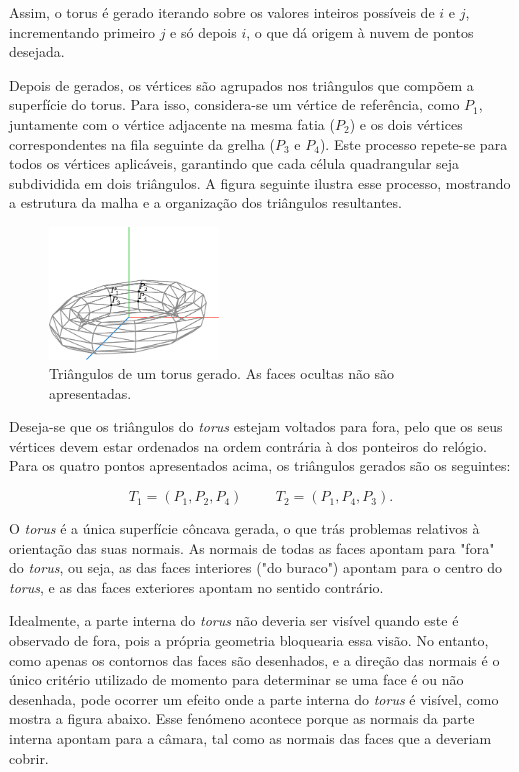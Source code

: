 \documentclass[12pt, a4paper]{article}
\begin{document}
Assim, o torus é gerado iterando sobre os valores inteiros possíveis de $i$ e $j$, incrementando
primeiro $j$ e só depois $i$, o que dá origem à nuvem de pontos desejada.

Depois de gerados, os vértices são agrupados nos triângulos que compõem a superfície do torus. Para
isso, considera-se um vértice de referência, como $P_1$, juntamente com o vértice adjacente na
mesma fatia ($P_2$) e os dois vértices correspondentes na fila seguinte da grelha ($P_3$ e $P_4$).
Este processo repete-se para todos os vértices aplicáveis, garantindo que cada célula quadrangular
seja subdividida em dois triângulos. A figura seguinte ilustra esse processo, mostrando a estrutura
da malha e a organização dos triângulos resultantes.

\begin{figure}[H]
    \centering
    \includegraphics[width=0.4\textwidth]{res/figures/TorusTriangle.pdf}
    \caption{Triângulos de um torus gerado. As faces ocultas não são apresentadas.}
\end{figure}

Deseja-se que os triângulos do \emph{torus} estejam voltados para fora, pelo que os seus vértices
devem estar ordenados na ordem contrária à dos ponteiros do relógio. Para os quatro pontos
apresentados acima, os triângulos gerados são os seguintes:

$$
T_1 = (P_1, P_2, P_4)
\hspace{1cm}
T_2 = (P_1, P_4, P_3).
$$

O \emph{torus} é a única superfície côncava gerada, o que trás problemas relativos à orientação das
suas normais. As normais de todas as faces apontam para "fora"{} do \emph{torus}, ou seja, as das
faces interiores ("do buraco"{}) apontam para o centro do \emph{torus}, e as das faces exteriores
apontam no sentido contrário.

Idealmente, a parte interna do \emph{torus} não deveria ser visível quando este é observado de fora,
pois a própria geometria bloquearia essa visão. No entanto, como apenas os contornos das faces são
desenhados, e a direção das normais é o único critério utilizado de momento para determinar se uma
face é ou não desenhada, pode ocorrer um efeito onde a parte interna do \emph{torus} é visível, como
mostra a figura abaixo. Esse fenómeno acontece porque as normais da parte interna apontam para a
câmara, tal como as normais das faces que a deveriam cobrir.
\end{document}

